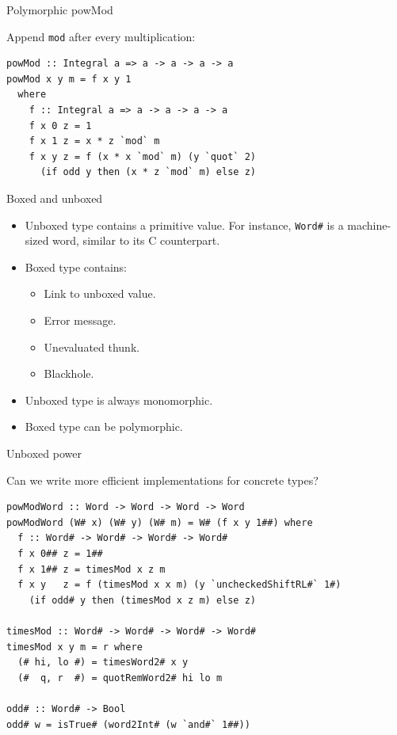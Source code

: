 \documentclass[handout]{beamer}
\begin{document}
\begin{frame}[fragile]{Polymorphic powMod}

Append {\tt mod} after every multiplication:

\begin{lstlisting}
powMod :: Integral a => a -> a -> a -> a
powMod x y m = f x y 1
  where
    f :: Integral a => a -> a -> a -> a
    f x 0 z = 1
    f x 1 z = x * z `mod` m
    f x y z = f (x * x `mod` m) (y `quot` 2)
      (if odd y then (x * z `mod` m) else z)
\end{lstlisting}

\end{frame}

\begin{frame}{Boxed and unboxed}

\begin{itemize}

\item Unboxed type contains a primitive value. For instance, {\tt Word\#} is a machine-sized word, similar to its C counterpart.
\item Boxed type contains:
  \begin{itemize}
  \item Link to unboxed value.
  \item Error message.
  \item Unevaluated thunk.
  \item Blackhole.
  \end{itemize}
\item Unboxed type is always monomorphic.
\item Boxed type can be polymorphic.

\end{itemize}

\end{frame}

\begin{frame}[fragile]{Unboxed power}

Can we write more efficient implementations for concrete types?

\begin{lstlisting}
powModWord :: Word -> Word -> Word -> Word
powModWord (W# x) (W# y) (W# m) = W# (f x y 1##) where
  f :: Word# -> Word# -> Word# -> Word#
  f x 0## z = 1##
  f x 1## z = timesMod x z m
  f x y   z = f (timesMod x x m) (y `uncheckedShiftRL#` 1#)
    (if odd# y then (timesMod x z m) else z)

timesMod :: Word# -> Word# -> Word# -> Word#
timesMod x y m = r where
  (# hi, lo #) = timesWord2# x y
  (#  q, r  #) = quotRemWord2# hi lo m

odd# :: Word# -> Bool
odd# w = isTrue# (word2Int# (w `and#` 1##))
\end{lstlisting}

\end{frame}
\end{document}
